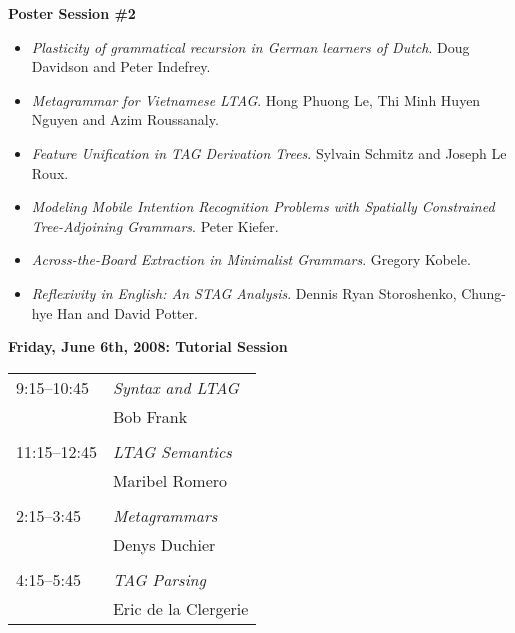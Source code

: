 \documentclass[12pt]{article}
\begin{document}
\bigskip
\noindent \textbf{Poster Session \#2}

\begin{itemize}
\item \textit{Plasticity of grammatical recursion in German learners of Dutch}. Doug Davidson and Peter Indefrey. 
\item \textit{Metagrammar for Vietnamese LTAG}. Hong Phuong Le, Thi Minh Huyen Nguyen and Azim Roussanaly. 
\item \textit{Feature Unification in TAG Derivation Trees}. Sylvain Schmitz and Joseph Le Roux. 
\item \textit{Modeling Mobile Intention Recognition Problems with Spatially Constrained Tree-Adjoining Grammars}. Peter Kiefer. 
\item \textit{Across-the-Board Extraction in Minimalist Grammars}. Gregory Kobele. 
\item \textit{Reflexivity in English: An STAG Analysis}. Dennis Ryan Storoshenko, Chung-hye Han and David Potter. 
\end{itemize}

\bigskip
\noindent \textbf{Friday, June 6th, 2008: Tutorial Session}
\bigskip

\begin{tabular}{ll}
9:15--10:45 & \textit{Syntax and LTAG} \\
& Bob Frank \\
& \\
11:15--12:45 & \textit{LTAG Semantics} \\
& Maribel Romero \\
& \\
2:15--3:45 & \textit{Metagrammars} \\
& Denys Duchier \\
& \\
4:15--5:45 & \textit{TAG Parsing} \\
& Eric de la Clergerie
\end{tabular}
\end{document}
